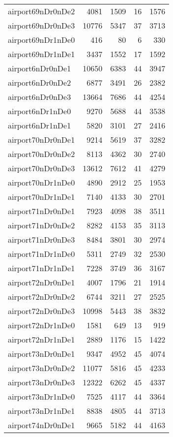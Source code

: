 \begin{longtable}{lrrrr}
airport69nDr0nDe2 & 4081 & 1509 & 16 & 1576 \\
airport69nDr0nDe3 & 10776 & 5347 & 37 & 3713 \\
airport69nDr1nDe0 & 416 & 80 & 6 & 330 \\
airport69nDr1nDe1 & 3437 & 1552 & 17 & 1592 \\
airport6nDr0nDe1 & 10650 & 6383 & 44 & 3947 \\
airport6nDr0nDe2 & 6877 & 3491 & 26 & 2382 \\
airport6nDr0nDe3 & 13664 & 7686 & 44 & 4254 \\
airport6nDr1nDe0 & 9270 & 5688 & 44 & 3538 \\
airport6nDr1nDe1 & 5820 & 3101 & 27 & 2416 \\
airport70nDr0nDe1 & 9214 & 5619 & 37 & 3282 \\
airport70nDr0nDe2 & 8113 & 4362 & 30 & 2740 \\
airport70nDr0nDe3 & 13612 & 7612 & 41 & 4279 \\
airport70nDr1nDe0 & 4890 & 2912 & 25 & 1953 \\
airport70nDr1nDe1 & 7140 & 4133 & 30 & 2701 \\
airport71nDr0nDe1 & 7923 & 4098 & 38 & 3511 \\
airport71nDr0nDe2 & 8282 & 4153 & 35 & 3113 \\
airport71nDr0nDe3 & 8484 & 3801 & 30 & 2974 \\
airport71nDr1nDe0 & 5311 & 2749 & 32 & 2530 \\
airport71nDr1nDe1 & 7228 & 3749 & 36 & 3167 \\
airport72nDr0nDe1 & 4007 & 1796 & 21 & 1914 \\
airport72nDr0nDe2 & 6744 & 3211 & 27 & 2525 \\
airport72nDr0nDe3 & 10998 & 5443 & 38 & 3832 \\
airport72nDr1nDe0 & 1581 & 649 & 13 & 919 \\
airport72nDr1nDe1 & 2889 & 1176 & 15 & 1422 \\
airport73nDr0nDe1 & 9347 & 4952 & 45 & 4074 \\
airport73nDr0nDe2 & 11077 & 5816 & 45 & 4233 \\
airport73nDr0nDe3 & 12322 & 6262 & 45 & 4337 \\
airport73nDr1nDe0 & 7525 & 4117 & 44 & 3364 \\
airport73nDr1nDe1 & 8838 & 4805 & 44 & 3713 \\
airport74nDr0nDe1 & 9665 & 5182 & 44 & 4163 \\

\end{longtable}
